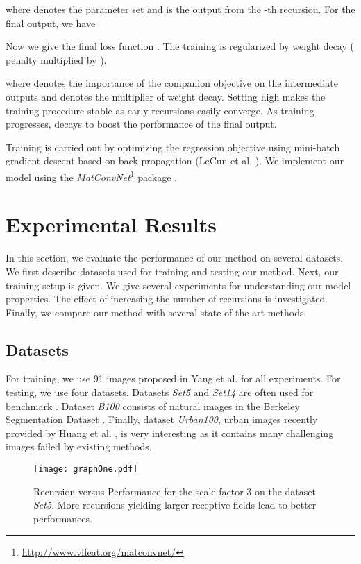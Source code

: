 \documentclass[10pt,twocolumn,letterpaper]{article}
\begin{document}
where  denotes the parameter set and  is the output from the -th recursion. For the final output, we have 


Now we give the final loss function . The training is regularized by weight decay ( penalty multiplied by ). 

where  denotes the importance of the companion objective on the intermediate outputs and  denotes the multiplier of weight decay.   Setting  high makes the training procedure stable as early recursions easily converge. As training progresses,  decays to boost the performance of the final output. 

Training is carried out by optimizing the regression objective using mini-batch gradient descent based on back-propagation (LeCun et al. \cite{lecun1998gradient}). We implement our model using the \textit{MatConvNet}\footnote{\url{ http://www.vlfeat.org/matconvnet/}} package \cite{arXiv:1412.4564}. 


\section{Experimental Results}
In this section, we evaluate the performance of our method on several datasets. We first describe datasets used for training and testing our method. Next, our training setup is given. We give several experiments for understanding our model properties. The effect of increasing the number of recursions is investigated. Finally, we compare our method with several state-of-the-art methods. 

\subsection{Datasets}
For training, we use 91 images proposed in Yang et al. \cite{yang2010image} for all experiments. For testing, we use four datasets. Datasets \textit{Set5} \cite{bevilacqua2012} and \textit{Set14} \cite{zeyde2012single} are often used for benchmark \cite{Timofte,Timofte2013,dong2014image}. Dataset \textit{B100}  consists of natural images in the Berkeley Segmentation Dataset \cite{Martin2001}. Finally, dataset \textit{Urban100}, urban images recently provided by Huang et al. \cite{Huang-CVPR-2015}, is very interesting as it contains many challenging images failed by existing methods.


\begin{figure}
\begin{adjustwidth}{0cm}{-0.0cm}
\centering
{\graphicspath{{figs/graph1/}}\texttt{[image: graphOne.pdf]}}
\caption{Recursion versus Performance for the scale factor 3 on the dataset \textit{Set5}. More recursions yielding larger receptive fields lead to better performances.}\end{adjustwidth}
\label{fig:more}
\end{figure}
\end{document}
